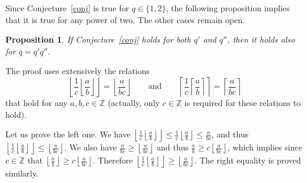 \documentclass[12pt]{amsart}
\newtheorem{proposition}{Proposition}
\theoremstyle{remark}
\def\Z{\mathbb{Z}}
\begin{document}
Since Conjecture~\ref{conj} is true for $q\in\{1,2\}$, the following proposition implies that it is true for any power of two. The other cases remain open.

\begin{proposition}\label{prop}
If Conjecture~\ref{conj} holds for both $q'$ and $q''$, then it holds also for $q=q'q''$.
\end{proposition}

The proof uses extensively the relations 
\begin{equation}\label{eq}
\left\lfloor\frac 1 c\left\lfloor \frac a b\right\rfloor\right\rfloor=\left\lfloor\frac{a}{bc}\right\rfloor\qquad\mbox{and}\qquad\left\lceil\frac 1 c{\left\lceil \frac a b\right\rceil}\right\rceil=\left\lceil\frac{a}{bc}\right\rceil
\end{equation} that hold for any $a,b,c\in\Z$ (actually, only $c\in\Z$ is required for these relations to hold).

Let us prove the left one. We have $\left\lfloor\frac 1 c\left\lfloor \frac a b\right\rfloor\right\rfloor\leq \frac 1 c\left\lfloor\frac a b\right\rfloor \leq\frac a {bc}$, and thus $\left\lfloor\frac 1 c\left\lfloor \frac a b\right\rfloor\right\rfloor\leq\left\lfloor\frac{a}{bc}\right\rfloor$. We also have $\frac a {bc}\geq \left\lfloor\frac{a}{bc}\right\rfloor$ and thus $\frac a {b}\geq c\left\lfloor\frac{a}{bc}\right\rfloor$, which implies since $c\in\Z$ that $\left\lfloor\frac a {b}\right\rfloor\geq c\left\lfloor\frac{a}{bc}\right\rfloor$. Therefore $\left\lfloor\frac 1 c\left\lfloor \frac a b\right\rfloor\right\rfloor\geq\left\lfloor\frac{a}{bc}\right\rfloor$. The right equality is proved similarly.
\end{document}
